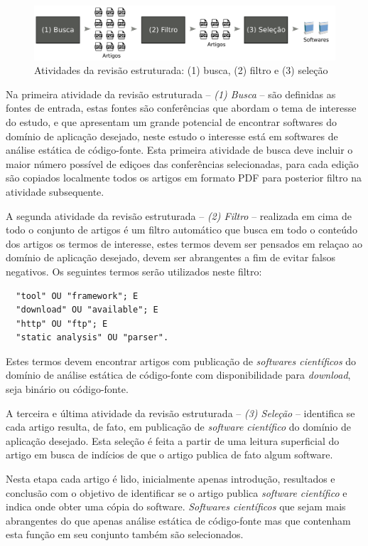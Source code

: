 \begin{figure}[h]
  \center
  \includegraphics[scale=0.21]{imagens/revisao-estruturada.png}
  \caption{Atividades da revisão estruturada: (1) busca, (2) filtro e (3) seleção}
  \label{figura-revisao-estruturada}
\end{figure}

Na primeira atividade da revisão estruturada -- {\it (1) Busca} -- são definidas as fontes de entrada,
estas fontes são conferências que abordam o tema de interesse do estudo, e que
apresentam um grande potencial de encontrar softwares do domínio de aplicação
desejado, neste estudo o interesse está em softwares de análise estática de
código-fonte. Esta primeira atividade de busca deve incluir o maior número
possível de ediçoes das conferências selecionadas, para cada edição são
copiados localmente todos os artigos em formato PDF para posterior filtro na
atividade subsequente.

A segunda atividade da revisão estruturada -- {\it (2) Filtro} -- realizada em cima de todo o conjunto
de artigos é um filtro automático que busca em todo o conteúdo dos artigos os
termos de interesse, estes termos devem ser pensados em relaçao ao domínio de
aplicação desejado, devem ser abrangentes a fim de evitar falsos negativos.
Os seguintes termos serão utilizados neste filtro:

\begin{verbatim}
  "tool" OU "framework"; E
  "download" OU "available"; E
  "http" OU "ftp"; E
  "static analysis" OU "parser".
\end{verbatim}

Estes termos devem encontrar artigos com publicação de {\it softwares
científicos} do domínio de análise estática de código-fonte com disponibilidade
para {\it download}, seja binário ou código-fonte.

A terceira e última atividade da revisão estruturada -- {\it (3) Seleção} --
identifica se cada artigo resulta, de fato, em publicação de {\it
software científico} do domínio de aplicação desejado. Esta seleção é feita a
partir de uma leitura superficial do artigo em busca de indícios de que o
artigo publica de fato algum software.

Nesta etapa cada artigo é lido, inicialmente apenas introdução, resultados e
conclusão com o objetivo de identificar se o artigo publica {\it software
científico} e indica onde obter uma cópia do software. {\it Softwares
científicos} que sejam mais abrangentes do que apenas análise estática de
código-fonte mas que contenham esta função em seu conjunto também são
selecionados.

